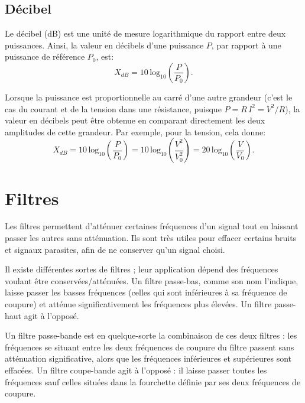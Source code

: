 \documentclass[12pt,oneside,letterpaper]{article}
\begin{document}
\subsection{Décibel}

Le décibel (dB) est une unité de mesure logarithmique du rapport entre deux puissances. Ainsi, la valeur en décibels d'une puissance $P$, par rapport à une puissance de référence $P_0$, est:
\begin{equation}
X_{dB}=10 \, \mathrm{log}_{10}\left( \frac{P}{P_0} \right).
\end{equation}

Lorsque la puissance est proportionnelle au carré d'une autre grandeur (c'est le cas du courant et de la tension dans une résistance, puisque $P=R\,I^2=V^2/R$), la valeur en décibels peut être obtenue en comparant directement les deux amplitudes de cette grandeur. Par exemple, pour la tension, cela donne:
\begin{equation}
X_{dB}=10 \, \mathrm{log}_{10}\left( \frac{P}{P_0} \right)=10 \, \mathrm{log}_{10}\left( \frac{V^2}{V_0^2} \right)=20 \, \mathrm{log}_{10}\left( \frac{V}{V_0} \right).
\end{equation}


\section{Filtres}

Les filtres permettent d'atténuer certaines fréquences d'un signal tout en laissant passer les autres sans atténuation. Ils sont très utiles pour effacer certains bruits et signaux parasites, afin de ne conserver qu'un signal choisi.

Il existe différentes sortes de filtres ; leur application dépend des fréquences voulant être conservées/atténuées. Un filtre passe-bas, comme son nom l'indique, laisse passer les basses fréquences (celles qui sont inférieures à sa fréquence de coupure) et atténue significativement les fréquences plus élevées. Un filtre passe-haut agit à l'opposé.

Un filtre passe-bande est en quelque-sorte la combinaison de ces deux filtres : les fréquences se situant entre les deux fréquences de coupure du filtre passent sans atténuation significative, alors que les fréquences inférieures et supérieures sont effacées. Un filtre coupe-bande agit à l'opposé : il laisse passer toutes les fréquences sauf celles situées dans la fourchette définie par ses deux fréquences de coupure.
\end{document}
